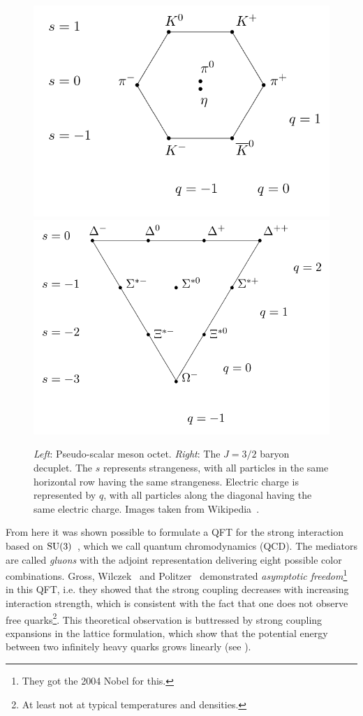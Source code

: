 \begin{figure}[t]
  \centering
  \includegraphics[width=0.48\linewidth]{figs/Meson_octet.png}
  \includegraphics[width=0.48\linewidth]{figs/Baryon_decuplet.png}
  \caption{{\it Left}: Pseudo-scalar meson octet. {\it Right}:
           The $J=3/2$ baryon decuplet. The $s$ represents strangeness,
           with all particles in the same horizontal row having the
           same strangeness. Electric charge is represented by $q$,
           with all particles along the diagonal having the same
           electric charge. Images taken from
           Wikipedia~\cite{wiki_eightfold}.}
  \label{fig:eightfold}
\end{figure}

From here it was shown possible to formulate a QFT for the strong interaction
based on $\operatorname{SU}(3)$~\cite{fritzsch_advantages_1973}, which we
call quantum chromodynamics (QCD). 
The mediators are called
{\it gluons} with the adjoint representation delivering
eight possible color combinations.
Gross, Wilczek~\cite{gross_d.j._ultraviolet_1973} and
Politzer~\cite{politzer_reliable_1973} demonstrated 
{\it asymptotic freedom}\footnote{They got the 2004 Nobel for this.}
 in this QFT, i.e. they showed that the
strong coupling decreases with increasing interaction strength, which is
consistent with the fact that one does not observe free quarks\footnote{At
least not at typical temperatures and densities.}.
This theoretical observation is buttressed by strong coupling
expansions in the lattice formulation, which show that the potential
energy between two infinitely heavy quarks grows linearly
(see ).

